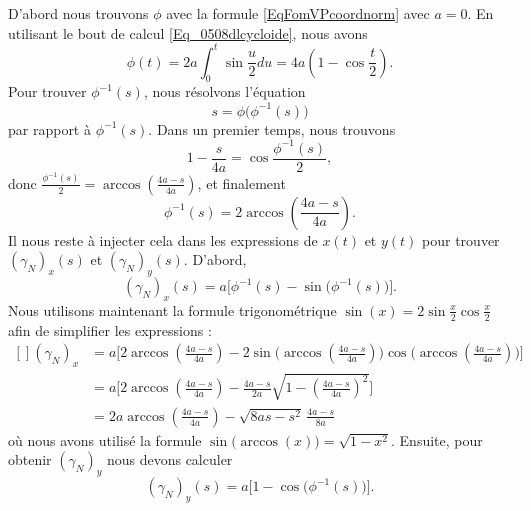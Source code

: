 \begin{example}
				D'abord nous trouvons $\phi$ avec la formule \eqref{EqFomVPcoordnorm} avec $a=0$. En utilisant le bout de calcul \eqref{Eq_0508dlcycloide}, nous avons
				\begin{equation}
					\phi(t)=2a\int_0^t\sin\frac{ u }{2}du=4a\left( 1-\cos\frac{t}{2} \right).
				\end{equation}
				Pour trouver $\phi^{-1}(s)$, nous résolvons l'équation
				\begin{equation}
					s=\phi\big( \phi^{-1}(s) \big)
				\end{equation}
				par rapport à $\phi^{-1}(s)$. Dans un premier temps, nous trouvons
				\begin{equation}
					1-\frac{ s }{ 4a }=\cos\frac{ \phi^{-1}(s) }{ 2 },
				\end{equation}
				donc $\frac{ \phi^{-1}(s) }{2}=\arccos(\frac{ 4a-s }{ 4a })$, et finalement
				\begin{equation}
					\phi^{-1}(s)=2\arccos\left(\frac{ 4a-s }{ 4a }\right).
				\end{equation}
				Il nous reste à injecter cela dans les expressions de $x(t)$ et $y(t)$ pour trouver $(\gamma_N)_x(s)$ et $(\gamma_N)_y(s)$. D'abord,
				\begin{equation}
					(\gamma_N)_x(s)=a\big[ \phi^{-1}(s)-\sin\big( \phi^{-1}(s) \big) \big].
				\end{equation}
				Nous utilisons maintenant la formule trigonométrique $\sin(x)=2\sin\frac{ x }{ 2 }\cos\frac{ x }{2}$ afin de simplifier les expressions :
				\begin{equation}
					\begin{aligned}[]
						(\gamma_N)_x & =a\Big[ 2\arccos\left( \frac{ 4a-s }{ 4a } \right)-2\sin\big( \arccos\left( \frac{ 4a-s }{ 4a } \right) \big)\cos\big( \arccos\left( \frac{ 4a-s }{ 4a } \right) \big) \Big] \\
						             & =a\Big[ 2\arccos\left( \frac{ 4a-s }{ 4a } \right)-\frac{ 4a-s }{ 2a } \sqrt{1-\left( \frac{ 4a-s }{ 4a } \right)^2}\Big]                                                    \\
						             & =2a\arccos\left( \frac{ 4a-s }{ 4a } \right)-\sqrt{8as-s^2}\,\frac{ 4a-s }{ 8a }
					\end{aligned}
				\end{equation}
				où nous avons utilisé la formule $\sin\big( \arccos(x) \big)=\sqrt{1-x^2}$. Ensuite, pour obtenir $(\gamma_N)_y$ nous devons calculer
				\begin{equation}
					(\gamma_N)_y(s)=a\big[ 1-\cos\big( \phi^{-1}(s) \big) \big].

\end{equation}
\end{example}
